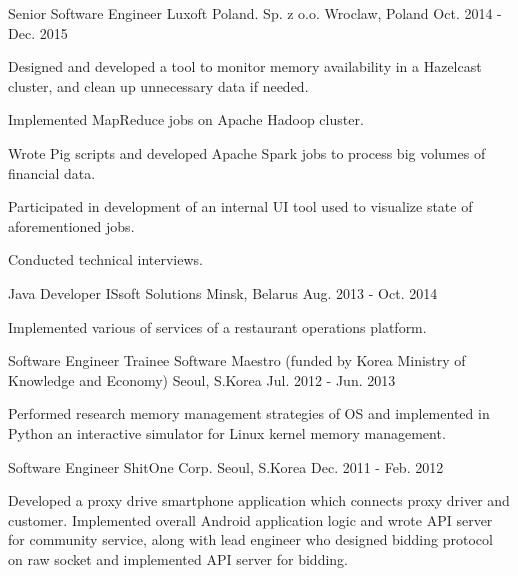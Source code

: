 \begin{cventries}
    \cventry
    {Senior Software Engineer} %
    {Luxoft Poland. Sp. z o.o.} %
    {Wroclaw, Poland} %
    {Oct. 2014 - Dec. 2015} %
    {
        \begin{cvitems} %
            \item {Designed and developed a tool to monitor memory availability in a Hazelcast cluster, and clean up unnecessary data if needed.}
            \item {Implemented MapReduce jobs on Apache Hadoop cluster.}
            \item {Wrote Pig scripts and developed Apache Spark jobs to process big volumes of financial data.}
            \item {Participated in development of an internal UI tool used to visualize state of aforementioned jobs.}
            \item {Conducted technical interviews.}
        \end{cvitems}
    }

    \cventry
    {Java Developer} %
    {ISsoft Solutions} %
    {Minsk, Belarus} %
    {Aug. 2013 - Oct. 2014} %
    {
        \begin{cvitems} %
            \item {Implemented various of services of a restaurant operations platform.}
        \end{cvitems}
    }

    \cventry
    {Software Engineer Trainee} %
    {Software Maestro (funded by Korea Ministry of Knowledge and Economy)} %
    {Seoul, S.Korea} %
    {Jul. 2012 - Jun. 2013} %
    {
        \begin{cvitems} %
            \item {Performed research memory management strategies of OS and implemented in Python an interactive simulator for Linux kernel memory management.}
        \end{cvitems}
    }

    \cventry
    {Software Engineer} %
    {ShitOne Corp.} %
    {Seoul, S.Korea} %
    {Dec. 2011 - Feb. 2012} %
    {
        \begin{cvitems} %
            \item {Developed a proxy drive smartphone application which connects proxy driver and customer. Implemented overall Android application logic and wrote API server for community service, along with lead engineer who designed bidding protocol on raw socket and implemented API server for bidding.}
        \end{cvitems}
    }


\end{cventries}
